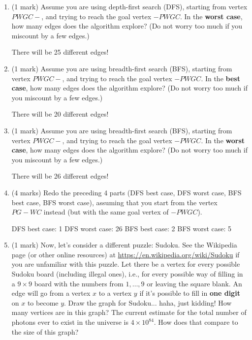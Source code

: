 \documentclass[11pt]{article}
\begin{document}
\begin{enumerate}
\item (1 mark)
Assume you are using depth-first search (DFS),
starting from vertex $PWGC-$,
and trying to reach the goal vertex $-PWGC$.
In the \textbf{worst case},
how many edges does the algorithm explore?
(Do not worry too much if you miscount by a few edges.) 

\begin{soln}
There will be 25 different edges!
\end{soln}

\item (1 mark)
Assume you are using breadth-first search (BFS),
starting from vertex $PWGC-$,
and trying to reach the goal vertex $-PWGC$.
In the \textbf{best case},
how many edges does the algorithm explore?
(Do not worry too much if you miscount by a few edges.)

\begin{soln}
There will be 20 different edges!
\end{soln}

\item (1 mark)
Assume you are using breadth-first search (BFS),
starting from vertex $PWGC-$,
and trying to reach the goal vertex $-PWGC$.
In the \textbf{worst case},
how many edges does the algorithm explore?
(Do not worry too much if you miscount by a few edges.)

\begin{soln}
There will be 26 different edges!
\end{soln}

\item (4 marks)
Redo the preceding 4 parts (DFS best case, DFS worst case, BFS best case,
BFS worst case), assuming that you start from the vertex
$PG-WC$ instead (but with the same goal vertex of $-PWGC$).

\begin{soln}
DFS best case: 1
DFS worst case: 26
BFS best case: 2
BFS worst case: 5
\end{soln}

\item (1 mark)
Now, let's consider a different puzzle:  Sudoku.
See the Wikipedia page (or other online resources) at
\url{https://en.wikipedia.org/wiki/Sudoku} if
you are unfamiliar with this puzzle.
Let there be a vertex for every possible Sudoku board (including illegal ones),
i.e., for
every possible way of filling in a $9\times 9$ board with the numbers
from $1,\ldots, 9$ or leaving the square blank.
An edge will go from a vertex $x$ to a vertex $y$ if it's possible to
fill in \textbf{one digit} on $x$ to become $y$.
Draw the graph for Sudoku... haha, just kidding!  How many vertices are
in this graph?  The current estimate for the total number of photons
ever to exist in the universe is $4\times 10^{84}$.  How does that compare
to the size of this graph?


\end{enumerate}
\end{document}

